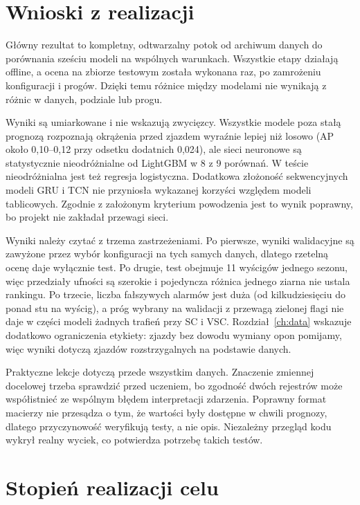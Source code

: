 \label{ch:discussion}

\section{Wnioski z realizacji}

Główny rezultat to kompletny, odtwarzalny potok od archiwum danych do
porównania sześciu modeli na wspólnych warunkach. Wszystkie etapy działają
offline, a ocena na zbiorze testowym została wykonana raz, po zamrożeniu
konfiguracji i progów. Dzięki temu różnice między modelami nie wynikają
z różnic w danych, podziale lub progu.

Wyniki są umiarkowane i nie wskazują zwycięzcy. Wszystkie modele poza stałą
prognozą rozpoznają okrążenia przed zjazdem wyraźnie lepiej niż losowo
(AP około 0,10--0,12 przy odsetku dodatnich 0,024), ale sieci neuronowe
są statystycznie nieodróżnialne od LightGBM w 8 z 9 porównań. W teście
nieodróżnialna jest też regresja logistyczna. Dodatkowa złożoność sekwencyjnych modeli GRU
i TCN nie przyniosła wykazanej korzyści względem modeli tablicowych.
Zgodnie z założonym kryterium powodzenia jest to wynik poprawny, bo
projekt nie zakładał przewagi sieci.

Wyniki należy czytać z trzema zastrzeżeniami. Po pierwsze, wyniki
walidacyjne są zawyżone przez wybór konfiguracji na tych samych danych,
dlatego rzetelną ocenę daje wyłącznie test. Po drugie, test obejmuje
11 wyścigów jednego sezonu, więc przedziały ufności są szerokie i pojedyncza
różnica jednego ziarna nie ustala rankingu. Po trzecie, liczba fałszywych
alarmów jest duża (od kilkudziesięciu do ponad stu na wyścig), a próg
wybrany na walidacji z przewagą zielonej flagi nie daje w części modeli
żadnych trafień przy SC i VSC. Rozdział~\ref{ch:data} wskazuje dodatkowo ograniczenia
etykiety: zjazdy bez dowodu wymiany opon pomijamy, więc wyniki dotyczą
zjazdów rozstrzygalnych na podstawie danych.

Praktyczne lekcje dotyczą przede wszystkim danych. Znaczenie zmiennej
docelowej trzeba sprawdzić przed uczeniem, bo zgodność dwóch rejestrów
może współistnieć ze wspólnym błędem interpretacji zdarzenia.
Poprawny format macierzy nie przesądza o tym, że wartości były dostępne
w chwili prognozy, dlatego przyczynowość weryfikują testy, a nie opis.
Niezależny przegląd kodu wykrył realny wyciek, co potwierdza potrzebę
takich testów.

\section{Stopień realizacji celu}

